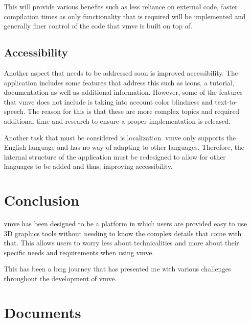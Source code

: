 \documentclass[11pt]{article}
\begin{document}
This will provide various benefits such as less reliance on external code,
faster compilation times as only functionality that is required will be
implemented and generally finer control of the code that \gls{vmve} is built on
top of.

\subsection{Accessibility}
Another aspect that needs to be addressed soon is improved accessibility. The
application includes some features that address this such as icons, a tutorial,
documentation as well as additional information. However, some of the features
that \gls{vmve} does not include is taking into account color blindness and
text-to-speech. The reason for this is that these are more complex topics and
required additional time and research to ensure a proper implementation is
released.

Another task that must be considered is localization. \gls{vmve} only supports
the English language and has no way of adapting to other languages. Therefore,
the internal structure of the application must be redesigned to allow for
other languages to be added and thus, improving accessibility.

\clearpage
\section{Conclusion}

\gls{vmve} has been designed to be a platform in which users are provided easy to use
3D graphics tools without needing to know the complex details that come with
that. This allows users to worry less about technicalities and more about their
specific needs and requirements when using \gls{vmve}.

This has been a long journey that has presented me with various challenges
throughout the development of \gls{vmve}.


\clearpage
\section{Documents}


\end{document}
